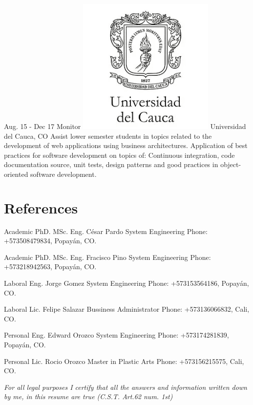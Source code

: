 \documentclass[american]{cv-class}
\begin{document}
\begin{entrylist}
	\entry
	{Aug. 15 - Dec 17}
	{Monitor}
	{{\includegraphics[scale=0.05]{img/unicauca-logo.png}} Universidad del Cauca, CO} 
	{\justifying Assist lower semester students in topics related to the development of web applications using business architectures. Application of best practices for software development on topics of: Continuous integration, code documentation source, unit tests, design patterns and good practices in object-oriented software development.}
	
\end{entrylist}


\section{References}
\begin{entrylist}
	  
	\entry
	{Academic}
	{PhD. MSc. Eng. César Pardo}
	{System Engineering} 
	{Phone: +573508479834, Popayán, CO.}
	
	\entry
	{Academic}
	{PhD. MSc. Eng. Fracisco Pino}
	{System Engineering} 
	{Phone: +573218942563, Popayán, CO.}
	
	\entry
	{Laboral}
	{Eng. Jorge Gomez}
	{System Engineering} 
	{Phone: +573153564186, Popayán, CO.}
	
	\entry
	{Laboral}
	{Lic. Felipe Salazar}
	{Bussiness Administrator} 
	{Phone: +573136066832, Cali, CO.}
	
	\entry
	{Personal}
	{Eng. Edward Orozco}
	{System Engineering} 
	{Phone: +573174281839, Popayán, CO.}
	
	\entry
	{Personal}
	{Lic. Rocio Orozco}
	{Master in Plastic Arts} 
	{Phone: +573156215575, Cali, CO.}
	
\end{entrylist}

\vspace{0.5cm}
\begin{center}
	\emph{For all legal purposes I certify that all
		the answers and information written down by me,
		in this resume are true (C.S.T.
	Art.62 num. 1st)}
\end{center}
\end{document}

